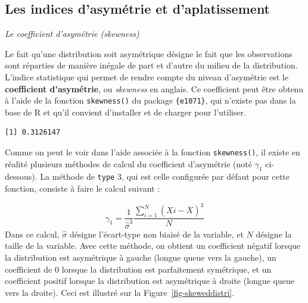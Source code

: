 \documentclass[
  letterpaper,
]{book}
\newenvironment{Shaded}{\begin{snugshade}}{\end{snugshade}}
\newcommand{\AttributeTok}[1]{\textcolor[rgb]{0.40,0.45,0.13}{#1}}
\newcommand{\DecValTok}[1]{\textcolor[rgb]{0.68,0.00,0.00}{#1}}
\newcommand{\FunctionTok}[1]{\textcolor[rgb]{0.28,0.35,0.67}{#1}}
\newcommand{\NormalTok}[1]{\textcolor[rgb]{0.00,0.23,0.31}{#1}}
\newcommand{\SpecialCharTok}[1]{\textcolor[rgb]{0.37,0.37,0.37}{#1}}
\begin{document}
\subsection{Les indices d'asymétrie et
d'aplatissement}\label{les-indices-dasymuxe9trie-et-daplatissement}

\emph{Le coefficient d'asymétrie (skewness)}

Le fait qu'une distribution soit asymétrique désigne le fait que les
observations sont réparties de manière inégale de part et d'autre du
milieu de la distribution. L'indice statistique qui permet de rendre
compte du niveau d'asymétrie est le \textbf{coefficient d'asymétrie}, ou
\emph{skewness} en anglais. Ce coefficient peut être obtenu à l'aide de
la fonction \texttt{skewness()} du package \texttt{\{e1071\}}, qui
n'existe pas dans la base de R et qu'il convient d'installer et de
charger pour l'utiliser.

\begin{Shaded}
\end{Shaded}

\begin{verbatim}
[1] 0.3126147
\end{verbatim}

Comme on peut le voir dans l'aide associée à la fonction
\texttt{skewness()}, il existe en réalité plusieurs méthodes de calcul
du coefficient d'asymétrie (noté \(\gamma_{1}\) ci-dessous). La méthode
de \texttt{type} 3, qui est celle configurée par défaut pour cette
fonction, consiste à faire le calcul suivant :

\[\gamma_{1} =  \frac{1}{\hat{\sigma}^3} {\frac{\sum_{i=1}^{N} (X{i} - \overline{X})^3}{N}}\]
Dans ce calcul, \(\hat{\sigma}\) désigne l'écart-type non biaisé de la
variable, et \(N\) désigne la taille de la variable. Avec cette méthode,
on obtient un coefficient négatif lorsque la distribution est
asymétrique à gauche (longue queue vers la gauche), un coefficient de 0
lorsque la distribution est parfaitement symétrique, et un coefficient
positif lorsque la distribution est asymétrique à droite (longue queue
vers la droite). Ceci est illustré sur la Figure~\ref{fig-skeweddistri}.
\end{document}

